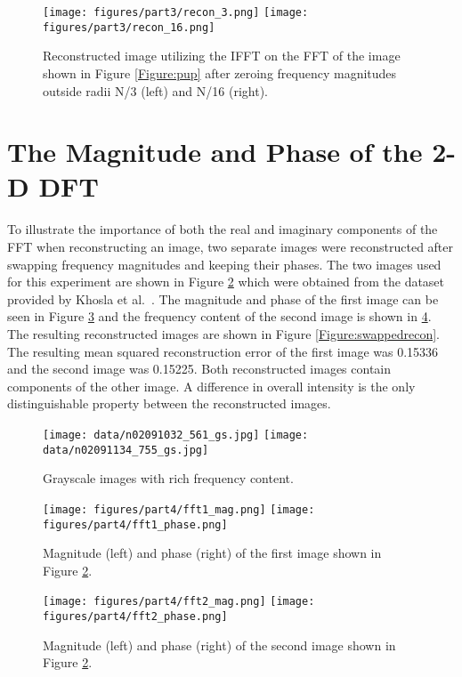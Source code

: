 \documentclass{article}
\begin{document}
\begin{figure}[!ht]
  \centering
  \texttt{[image: figures/part3/recon\_3.png]}
  \texttt{[image: figures/part3/recon\_16.png]}
  \caption{Reconstructed image utilizing the IFFT on the FFT of the image shown in Figure \ref{Figure:pup} after zeroing frequency magnitudes outside radii N/3 (left) and N/16 (right). }
  \label{Figure:badrecons}
\end{figure}


\section{The Magnitude and Phase of the 2-D DFT}
To illustrate the importance of both the real and imaginary components of the FFT when reconstructing an image, two separate images were reconstructed after swapping frequency magnitudes and keeping their phases. The two images used for this experiment are shown in Figure \ref{Figure:pups} which were obtained from the dataset provided by Khosla et al.\ \cite{dogs}. The magnitude and phase of the first image can be seen in Figure \ref{Figure:pup1fft} and the frequency content of the second image is shown in \ref{Figure:pup2fft}. The resulting reconstructed images are shown in Figure \ref{Figure:swappedrecon}. The resulting mean squared reconstruction error of the first image was 0.15336 and the second image was 0.15225. Both reconstructed images contain components of the other image. A difference in overall intensity is the only distinguishable property between the reconstructed images.

\begin{figure}[!ht]
  \centering
  \texttt{[image: data/n02091032\_561\_gs.jpg]}
  \texttt{[image: data/n02091134\_755\_gs.jpg]}
  \caption{Grayscale images with rich frequency content. }
  \label{Figure:pups}
\end{figure}

\begin{figure}[!ht]
  \centering
  \texttt{[image: figures/part4/fft1\_mag.png]}
  \texttt{[image: figures/part4/fft1\_phase.png]}
  \caption{Magnitude (left) and phase (right) of the first image shown in Figure \ref{Figure:pups}.}
  \label{Figure:pup1fft}
\end{figure}

\begin{figure}[!ht]
  \centering
  \texttt{[image: figures/part4/fft2\_mag.png]}
  \texttt{[image: figures/part4/fft2\_phase.png]}
  \caption{Magnitude (left) and phase (right) of the second image shown in Figure \ref{Figure:pups}.}
  \label{Figure:pup2fft}
\end{figure}
\end{document}
